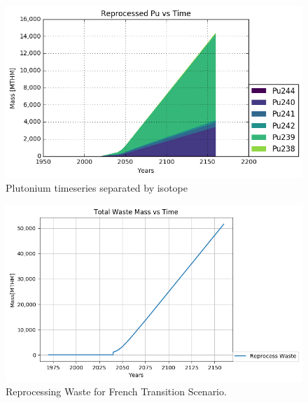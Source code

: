 		\begin{figure}[htbp!]
			\begin{center}
				\includegraphics[width=\columnwidth]{./images/french-transition/rep_pu.png}
			\end{center}
			\caption{Plutonium timeseries separated by isotope}
			\label{fig:pu_isotopics}
		\end{figure}
		
		\begin{figure}[htbp!]
			\begin{center}
				\includegraphics[width=\columnwidth]{./images/french-transition/reprocess_waste.png}
			\end{center}
			\caption{Reprocessing Waste for French Transition Scenario.}
			\label{fig:reprocess_waste}
		\end{figure}
		
